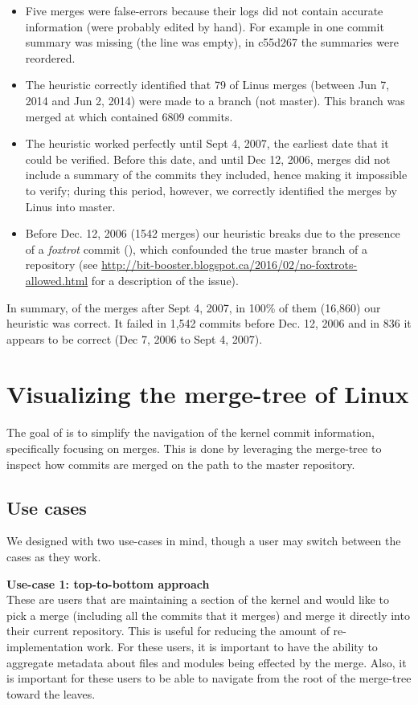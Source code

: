 \documentclass[draft]{IEEEtran}
\begin{document}
\begin{itemize}
\item Five merges were false-errors because their logs did not contain accurate information (were probably edited by
  hand). For example in  one commit summary was missing (the line was empty), in \mycode
  {c55d267} the summaries were reordered.
\item The heuristic correctly identified that 79 of Linus merges (between Jun 7, 2014 and Jun 2, 2014) were made to a
  branch (not master). This branch was merged at  which contained 6809 commits.
\item The heuristic worked perfectly until Sept 4, 2007, the earliest date that it could be verified.
  Before this date, and until Dec 12, 2006, merges did not include a summary of the commits they included, hence making it
  impossible to verify; during this period, however, we correctly identified the merges by Linus into master.
\item Before Dec. 12, 2006 (1542 merges) our heuristic breaks due to the
presence of a \textit{foxtrot} commit (), which confounded the true master branch of a
repository (see \url{http://bit-booster.blogspot.ca/2016/02/no-foxtrots-allowed.html} for a description of the issue).
\end{itemize}

In summary, of the merges after Sept 4, 2007, in 100\% of them (16,860)
our heuristic was correct. It failed in 1,542 commits before Dec. 12,
2006 and in 836 it appears to be correct (Dec 7, 2006 to Sept 4, 2007).

\section{Visualizing the merge-tree of Linux}

The goal of \tool is to simplify the navigation of the kernel commit
information, specifically focusing on merges. This is done by leveraging
the merge-tree to inspect how commits are merged on the path to the
master repository.

\subsection{Use cases}

We designed \tool with two use-cases in mind, though a user may switch
between the cases as they work.

\noindent \textbf{Use-case 1: top-to-bottom
  approach}\label{sec:usecase1}\\ These are users that are maintaining a
section of the kernel and would like to pick a merge (including all the
commits that it merges) and merge it directly into their current
repository. This is useful for reducing the amount of re-implementation
work. For these users, it is important to have the ability to aggregate
metadata about files and modules being effected by the merge. Also, it
is important for these users to be able to navigate from the root of the
merge-tree toward the leaves.
\end{document}
